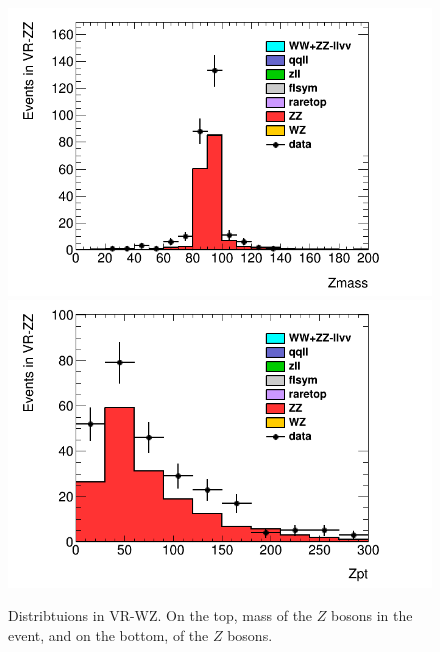 \begin{centering}
\begin{figure}[htbp]
\centering
\includegraphics[width=.9\textwidth]{figures/dibosons/ZZ_Zmass.png}
\includegraphics[width=.9\textwidth]{figures/dibosons/ZZ_Zpt.png}

\caption{Distribtuions in VR-WZ. On the top, mass of the $Z$ bosons in the event, and on the bottom, \pT of the $Z$ bosons. \label{fig:diboson_zz}}
\end{figure}
\end{centering}

